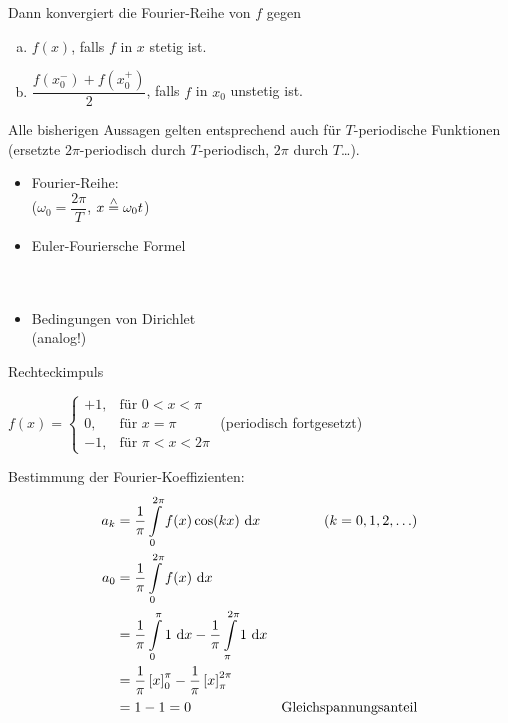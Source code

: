 Dann konvergiert die Fourier-Reihe von $f$ gegen
\begin{enumerate}[a)]
	\item $f(x)$, falls $f$ in $x$ stetig ist.
	\item $\dfrac{f(x_0^-)+f(x_0^+)}{2}$, falls $f$ in $x_0$ unstetig ist.
\end{enumerate}

\Bem Alle bisherigen Aussagen gelten entsprechend auch für $T$-periodische Funktionen (ersetzte $2\pi$-periodisch durch $T$-periodisch, $2\pi$ durch $T$\ldots).

\begin{itemize}
	\item Fourier-Reihe:\\
	\hhspace{2cm}\qquad($\omega_0=\dfrac{2\pi}{T}$, $x\stackrel{\wedge}{=}\omega_0t$)
	
	\item Euler-Fouriersche Formel\\
	\hhspace{2cm}\\
	\hhspace{2cm}\\
	
	\item Bedingungen von Dirichlet\\
	(analog!)
\end{itemize}

\Bsp Rechteckimpuls

$f(x)=\left\{\begin{array}{rl}
+1,&\text{für }{0<x<\pi}\\
0,&\text{für }{x=\pi}\\
-1,&\text{für }{\pi<x<2\pi}
\end{array}\right.$ (periodisch fortgesetzt)

Bestimmung der Fourier-Koeffizienten:
\begin{align*}
a_k&=\dfrac{1}{\pi}\int\limits_{0}^{2\pi}f(x)\cos(kx)\ \mathrm{d}x&(k=0,1,2,\ldots)\\
a_0&=\dfrac{1}{\pi}\int\limits_{0}^{2\pi}f(x)\ \mathrm{d}x\\
&=\dfrac{1}{\pi}\int\limits_{0}^{\pi}1\ \mathrm{d}x-\dfrac{1}{\pi}\int\limits_{\pi}^{2\pi}1\ \mathrm{d}x\\
&=\dfrac{1}{\pi}\left[x\right]_{0}^{\pi}-\dfrac{1}{\pi}\left[x\right]_{\pi}^{2\pi}\\
&=1-1=0&\text{Gleichspannungsanteil}
\end{align*}


